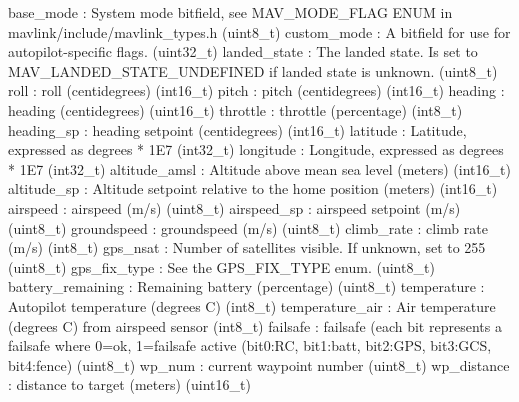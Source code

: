 \begin{DoxyVerb}
\begin{DoxyVerb}
\begin{DoxyVerb}
base_mode                 : System mode bitfield, see MAV_MODE_FLAG ENUM in mavlink/include/mavlink_types.h (uint8_t)
custom_mode               : A bitfield for use for autopilot-specific flags. (uint32_t)
landed_state              : The landed state. Is set to MAV_LANDED_STATE_UNDEFINED if landed state is unknown. (uint8_t)
roll                      : roll (centidegrees) (int16_t)
pitch                     : pitch (centidegrees) (int16_t)
heading                   : heading (centidegrees) (uint16_t)
throttle                  : throttle (percentage) (int8_t)
heading_sp                : heading setpoint (centidegrees) (int16_t)
latitude                  : Latitude, expressed as degrees * 1E7 (int32_t)
longitude                 : Longitude, expressed as degrees * 1E7 (int32_t)
altitude_amsl             : Altitude above mean sea level (meters) (int16_t)
altitude_sp               : Altitude setpoint relative to the home position (meters) (int16_t)
airspeed                  : airspeed (m/s) (uint8_t)
airspeed_sp               : airspeed setpoint (m/s) (uint8_t)
groundspeed               : groundspeed (m/s) (uint8_t)
climb_rate                : climb rate (m/s) (int8_t)
gps_nsat                  : Number of satellites visible. If unknown, set to 255 (uint8_t)
gps_fix_type              : See the GPS_FIX_TYPE enum. (uint8_t)
battery_remaining         : Remaining battery (percentage) (uint8_t)
temperature               : Autopilot temperature (degrees C) (int8_t)
temperature_air           : Air temperature (degrees C) from airspeed sensor (int8_t)
failsafe                  : failsafe (each bit represents a failsafe where 0=ok, 1=failsafe active (bit0:RC, bit1:batt, bit2:GPS, bit3:GCS, bit4:fence) (uint8_t)
wp_num                    : current waypoint number (uint8_t)
wp_distance               : distance to target (meters) (uint16_t)\end{DoxyVerb}
 \mbox{\label{classpymavlink_1_1dialects_1_1v10_1_1MAVLink_a3b0d40fb21b814adb06fad96941c18ee}} 

\end{DoxyVerb}
\end{DoxyVerb}
